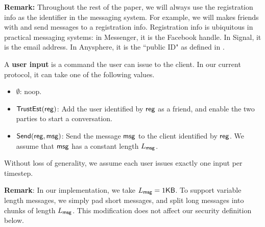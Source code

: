 \textbf{Remark: }Throughout the rest of the paper, we will always use the registration info as the identifier in the messaging system. For example, we will makes friends with and send messages to a registration info. Registration info is ubiquitous in practical messaging systems: in Messenger, it is the Facebook handle. In Signal, it is the email address. In Anysphere, it is the ``public ID" as defined in \cite[Figure 6]{whitepaper}.
\begin{definition}
\label{defn:user-input}
A \textbf{user input} is a command the user can issue to the client. In our current protocol, it can take one of the following values.
\begin{itemize}
    \item $\emptyset$: noop.
    \item $\mathsf{TrustEst}(\mathsf{reg})$: Add the user identified by $\mathsf{reg}$ as a friend, and enable the two parties to start a conversation.
    \item $\mathsf{Send}(\mathsf{reg}, \mathsf{msg})$: Send the message $\mathsf{msg}$ to the client identified by $\mathsf{reg}$. We assume that $\mathsf{msg}$ has a constant length $L_{\mathsf{msg}}$.
\end{itemize}


Without loss of generality, we assume each user issues exactly one input per timestep.
\end{definition}
\textbf{Remark}:  In our implementation, we take $L_{\mathsf{msg}} = 1\mathsf{KB}$. To support variable length messages, we simply pad short messages, and split long messages into chunks of length $L_{\mathsf{msg}}$. This modification does not affect our security definition below.
